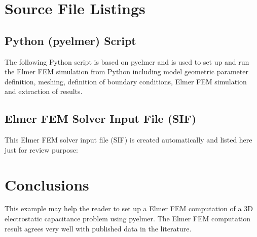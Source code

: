 \documentclass[10pt,a4paper,titlepage]{article}
\begin{document}
	
	\section{Source File Listings}
	
	\subsection{Python (pyelmer) Script}\label{3835864466}
	
	The following Python script is based on pyelmer \cite{pyelmer} and is used to set up and run the Elmer FEM simulation from Python including model geometric parameter definition, meshing, definition of boundary conditions, Elmer FEM simulation and extraction of results. 
	
	\clearpage
	
	
	
	\lstset{style=myStyle}
	
	
	
	\clearpage
	\subsection{Elmer FEM Solver Input File (SIF)}
	
	This Elmer FEM solver input file (SIF) is created automatically and listed here just for review purpose:
	
	
	
	
	\section{Conclusions}
	
	This example may help the reader to set up a Elmer FEM computation of a 3D electrostatic capacitance problem using pyelmer. The Elmer FEM computation result agrees very well with published data in the literature.
	
\end{document}
